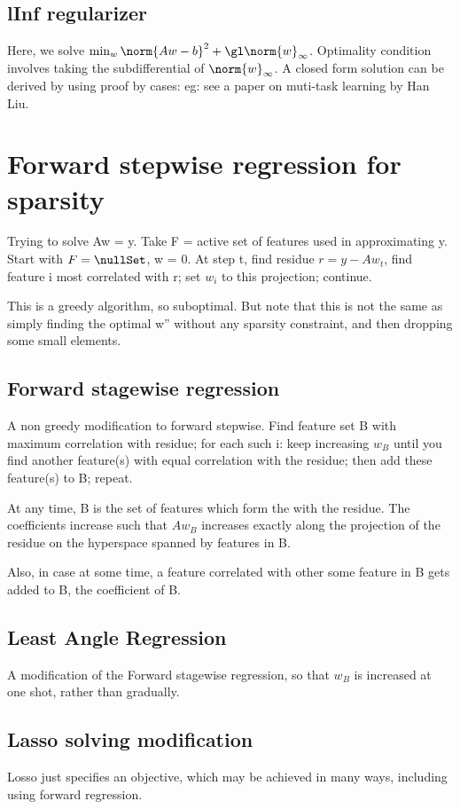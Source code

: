 \documentclass[oneside, article]{memoir}
\begin{document}
\subsection{lInf regularizer}
Here, we solve $\min_w \norm{Aw - b}^{2} + \gl \norm{w}_\infty$. Optimality condition involves taking the subdifferential of $\norm{w}_\infty$. A closed form solution can be derived by using proof by cases: eg: see a paper on muti-task learning by Han Liu.

\section{Forward stepwise regression for sparsity}
Trying to solve Aw = y. Take F = active set of features used in approximating y. Start with $F = \nullSet$, w = 0. At step t, find residue $r = y - Aw_t$, find feature i most correlated with r; set $w_{i}$ to this projection; continue. 

This is a greedy algorithm, so suboptimal. But note that this is not the same as simply finding the optimal w'' without any sparsity constraint, and then dropping some small elements.

\subsection{Forward stagewise regression}
A non greedy modification to forward stepwise. Find feature set B with maximum correlation with residue; for each such i: keep increasing $w_{B}$ until you find another feature(s) with equal correlation with the residue; then add these feature(s) to B; repeat.

At any time, B is the set of features which form the  with the residue. The coefficients increase such that $Aw_B$ increases exactly along the projection of the residue on the hyperspace spanned by features in B.

Also, in case at some time, a feature correlated with other some feature in B gets added to B, the coefficient of B.

\subsection{Least Angle Regression}
A modification of the Forward stagewise regression, so that $w_{B}$ is increased at one shot, rather than gradually.

\subsection{Lasso solving modification}
Losso just specifies an objective, which may be achieved in many ways, including using forward regression.
\end{document}
